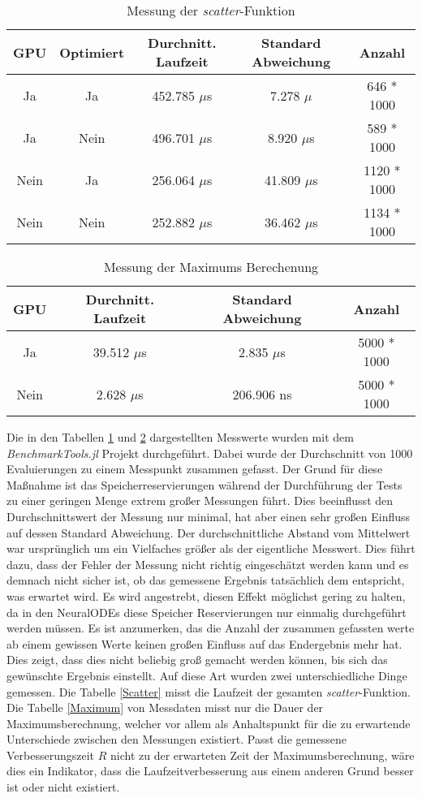 \begin{table}[h!]
\centering
\begin{tabular}{c|c|c|c|c} 
     GPU & Optimiert & Durchnitt. Laufzeit & Standard Abweichung & Anzahl \\
     \hline
     Ja & Ja     & 452.785 $\mu$s  & 7.278  $\mu$   & 646 * 1000\\
     Ja & Nein   & 496.701 $\mu$s  & 8.920  $\mu$s  &  589 * 1000\\
     Nein & Ja   & 256.064 $\mu$s  & 41.809 $\mu$s  & 1120 * 1000\\
     Nein & Nein & 252.882 $\mu$s  & 36.462 $\mu$s  & 1134 * 1000\\
\end{tabular}
\caption{Messung der \textit{scatter}-Funktion}
\label{table:Scatter}
\end{table}

\begin{table}[h!] 
\centering
\begin{tabular}{c|c|c|c}
     GPU & Durchnitt. Laufzeit & Standard Abweichung & Anzahl \\
     \hline
     Ja     & 39.512 $\mu$s  & 2.835 $\mu$s & 5000 * 1000 \\
     Nein   & 2.628  $\mu$s  &  206.906 ns & 5000 * 1000 \\
\end{tabular}
\caption{Messung der Maximums Berechenung}
\label{table:Maximum}
\end{table}

Die in den Tabellen \ref{table:Scatter} und \ref{table:Maximum} dargestellten Messwerte wurden mit dem \textit{BenchmarkTools.jl} Projekt durchgeführt.
Dabei wurde der Durchschnitt von 1000 Evaluierungen zu einem Messpunkt zusammen gefasst.
Der Grund für diese Maßnahme ist das Speicherreservierungen während der Durchführung der Tests zu einer geringen Menge extrem großer 
Messungen führt.
Dies beeinflusst den Durchschnittswert der Messung nur minimal, hat aber einen sehr großen Einfluss auf dessen Standard Abweichung.
Der durchschnittliche Abstand vom Mittelwert war ursprünglich
um ein Vielfaches größer als der eigentliche Messwert.
Dies führt dazu, dass der Fehler der Messung nicht richtig eingeschätzt werden kann und es demnach nicht sicher ist, ob das gemessene Ergebnis tatsächlich dem entspricht, was erwartet wird.
Es wird angestrebt, diesen Effekt möglichst gering zu halten, da in den NeuralODEs diese Speicher Reservierungen nur einmalig durchgeführt werden müssen.
Es ist anzumerken, das die Anzahl der zusammen gefassten werte ab einem gewissen Werte keinen großen Einfluss auf das Endergebnis mehr hat.
Dies zeigt, dass dies nicht beliebig groß gemacht werden können, bis sich das gewünschte Ergebnis einstellt.
Auf diese Art wurden zwei unterschiedliche Dinge gemessen.
Die Tabelle \ref{Scatter} misst die Laufzeit der gesamten \textit{scatter}-Funktion.
Die Tabelle \ref{Maximum} von Messdaten misst nur die Dauer der Maximumsberechnung, welcher vor allem als Anhaltspunkt für die zu erwartende Unterschiede zwischen den Messungen 
existiert.
Passt die gemessene Verbesserungszeit $R$ nicht zu der erwarteten Zeit der Maximumsberechnung, wäre dies ein Indikator, dass die Laufzeitverbesserung aus einem anderen Grund besser ist oder nicht existiert.

